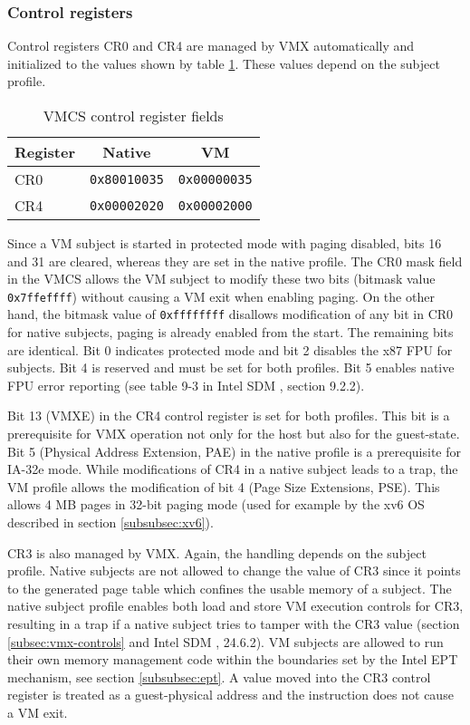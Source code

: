 \subsubsection{Control registers}\label{subsubsec:control-regs}
Control registers CR0 and CR4 are managed by VMX automatically and initialized
to the values shown by table \ref{tab:vmcs-control-regs}. These values depend
on the subject profile.

\begin{table}[h]
	\centering
	\begin{tabular}{l|c|c}
		\textbf{Register} & \textbf{Native} & \textbf{VM} \\
		\hline
		CR0 & \texttt{0x80010035} & \texttt{0x00000035} \\
		CR4 & \texttt{0x00002020} & \texttt{0x00002000} \\
		\hline
	\end{tabular}
	\caption{VMCS control register fields}
	\label{tab:vmcs-control-regs}
\end{table}

Since a VM subject is started in protected mode with paging disabled, bits 16
and 31 are cleared, whereas they are set in the native profile. The CR0 mask
field in the VMCS allows the VM subject to modify these two bits (bitmask value
\texttt{0x7ffeffff}) without causing a VM exit when enabling paging. On the
other hand, the bitmask value of \texttt{0xffffffff} disallows modification of
any bit in CR0 for native subjects, paging is already enabled from the start.
The remaining bits are identical. Bit 0 indicates protected mode and bit 2
disables the x87 FPU for subjects. Bit 4 is reserved and must be set for both
profiles. Bit 5 enables native FPU error reporting (see table 9-3 in Intel SDM
\cite{IntelSDM}, section 9.2.2).

Bit 13 (VMXE) in the CR4 control register is set for both profiles. This bit is
a prerequisite for VMX operation not only for the host but also for the
guest-state. Bit 5 (Physical Address Extension, PAE) in the native
profile is a prerequisite for IA-32e mode. While modifications of CR4 in a
native subject leads to a trap, the VM profile allows the modification of bit 4
(Page Size Extensions, PSE). This allows 4 MB pages in 32-bit paging
mode (used for example by the xv6 OS described in section \ref{subsubsec:xv6}).

CR3 is also managed by VMX. Again, the handling depends on the subject profile.
Native subjects are not allowed to change the value of CR3 since it points to
the generated page table which confines the usable memory of a subject. The
native subject profile enables both load and store VM execution controls for
CR3, resulting in a trap if a native subject tries to tamper with the CR3 value
(section \ref{subsec:vmx-controls} and Intel SDM \cite{IntelSDM}, 24.6.2). VM
subjects are allowed to run their own memory management code within the
boundaries set by the Intel EPT mechanism, see section \ref{subsubsec:ept}.  A
value moved into the CR3 control register is treated as a guest-physical address
and the instruction does not cause a VM exit.

